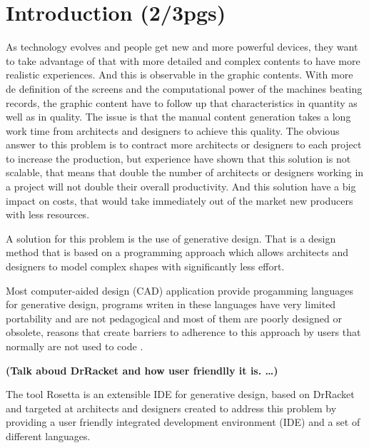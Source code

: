 
% 
% 

\section{Introduction (2/3pgs)}
\label{sec:Introduction}


As technology evolves and people get new and more powerful devices, they want to take advantage of that with more detailed and complex contents to have more realistic experiences. 
And this is observable in the graphic contents. With more de definition of the screens and the computational power of the machines beating records, the graphic content have to follow up that characteristics in quantity as well as in quality. The issue is that the manual content generation takes a long work time from architects and designers to achieve this quality.
The obvious answer to this problem is to contract more architects or designers to each project to increase the production, but experience have shown that this solution is not scalable, that means that double the number of architects or designers working in a project will not double their overall productivity. And this solution have a big impact on costs, that would take immediately out of the market new producers with less resources.

A solution for this problem is the use of generative design. That is a design method that is based on a programming approach which allows architects and designers to model complex shapes with significantly less effort. 

Most computer-aided design (CAD) application provide progamming languages for generative design, programs writen in these languages have very limited portability and are not pedagogical and most of them are poorly designed or obsolete, reasons that create barriers to adherence to this approach by users that normally are not used to code \cite{ramos_et_al:OASIcs:2014:4565}.

\textbf{(Talk aboud DrRacket and how user friendlly it is. \dots)}

The tool Rosetta is an extensible IDE for generative design, based on DrRacket and targeted at architects and designers \cite{Leit2012} created to address this problem by providing a user friendly integrated development environment (IDE) and a set of different languages. 



